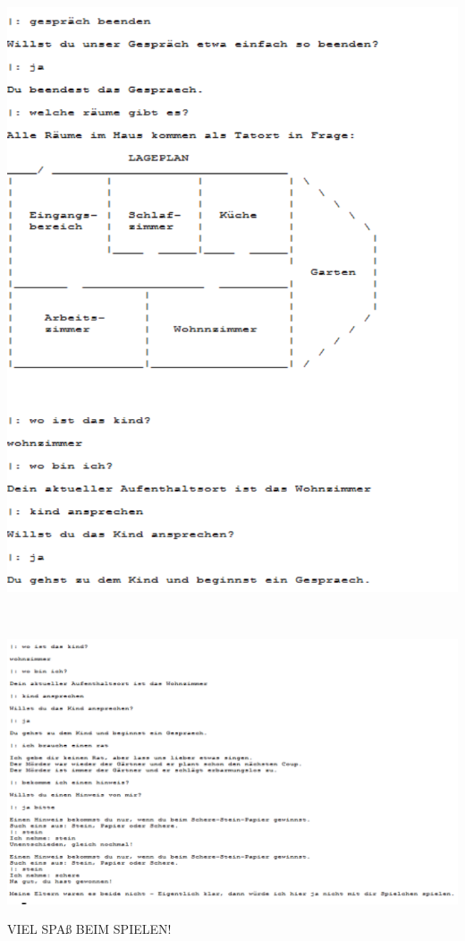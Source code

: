 \documentclass[10pt,a4paper]{article}
\begin{document}
\begin{itemize}
\begin{minipage}{0.5\textwidth}
\includegraphics[scale=0.7]{bild2.png}
\end{minipage}\\
\begin{minipage}{0.5\textwidth}
\includegraphics[scale=0.7]{bild3.png}
\end{minipage}

\end{itemize}


VIEL SPAß BEIM SPIELEN!
\end{document}
